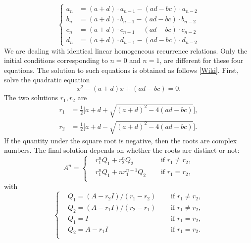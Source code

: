 \documentclass[oneside,10pt]{book}
\begin{document}
\begin{equation*}
  \left\{
    \begin{aligned}
      a_n & =(a+d)\cdot a_{n-1}-(ad-bc)\cdot a_{n-2}\\
      b_n & =(a+d)\cdot b_{n-1}-(ad-bc)\cdot b_{n-2}\\
      c_n & =(a+d)\cdot c_{n-1}-(ad-bc)\cdot c_{n-2}\\
      d_n & =(a+d)\cdot d_{n-1}-(ad-bc)\cdot d_{n-2}
    \end{aligned}
  \right.
\end{equation*}
We are dealing with identical linear homogeneous recurrence relations. Only the initial conditions corresponding to $n = 0$ and $n = 1$, are different for these four equations. The solution to such equations is obtained as follows [\href{https://en.wikipedia.org/wiki/Linear_recurrence_with_constant_coefficients}{Wiki}]. First, solve the quadratic equation
\begin{equation}\label{cplr}
x^2 - (a+d)x + (ad-bc)=0.
\end{equation}
The two solutions $r_1,r_2$ are
$$
\begin{aligned}
      r_1 & =\frac{1}{2}\Big[a+d+ \sqrt{(a+d)^2-4(ad-bc)}\Big],\\
      r_2 & =\frac{1}{2}\Big[a+d-\sqrt{(a+d)^2-4(ad-bc)}\Big].
\end{aligned}
$$
If the quantity under the square root is negative, then the roots are complex numbers. The final solution depends on whether the roots are distinct or not:
\begin{equation}\label{linea1}
A^n=\left\{
\begin{aligned}
      & r_1^n Q_1 + r_2^n Q_2 & \quad \text{ if } r_1\neq r_2,\\
     & r_1^n Q_1 + n r_1^{n-1} Q_2 & \quad \text{ if } r_1= r_2,\\
\end{aligned}
\right.
\end{equation}
with 
\begin{equation}\label{linea2}
\left\{
\begin{aligned}
      & Q_1 = (A-r_2 I)/(r_1-r_2) & \quad \text{ if } r_1\neq r_2,\\  
     &  Q_2 = (A-r_1 I)/(r_2-r_1) & \quad \text{ if } r_1\neq r_2,\\  
    & Q_1 = I & \quad \text{ if } r_1= r_2,\\
   & Q_2 = A-r_1 I & \quad \text{ if } r_1= r_2.\\
\end{aligned}
\right.
\end{equation}
\end{document}
